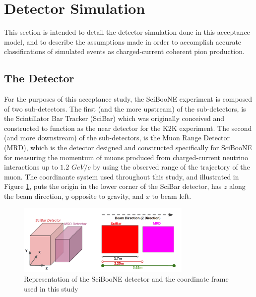 \documentclass[11pt]{article}
\begin{document}
\section{Detector Simulation}
\label{sec:simulation}
This section is intended to detail the detector simulation done in this acceptance model, and to describe the assumptions made in order to accomplish accurate classifications of simulated events as charged-current coherent pion production.

\subsection{The Detector}
\label{sub:detector}
For the purposes of this acceptance study, the SciBooNE experiment is composed of two sub-detectors. The first (and the more upstream) of the sub-detectors, is the Scintillator Bar Tracker (SciBar) which was originally conceived and constructed to function as the near detector for the K2K experiment. The second (and more downstream) of the sub-detectors, is the Muon Range Detector (MRD), which is the detector designed and constructed specifically for SciBooNE for measuring the momentum of muons produced from charged-current neutrino interactions up to $1.2$ $GeV/c$ by using the observed range of the trajectory of the muon. The coordinante system used throughout this study, and illustrated in  Figure \ref*{fig:SciBooNEDetector}, puts the origin in the lower corner of the SciBar detector, has $z$ along the beam direction, $y$ opposite to gravity, and $x$ to beam left. 

\begin{figure}[H]
\centering
\includegraphics[width=0.75\textwidth]{EventClassifications/SciBooNEDetector.png}
\caption{Representation of the SciBooNE detector and the coordinate frame used in this study}
\label{fig:SciBooNEDetector}
\end{figure}
\end{document}
